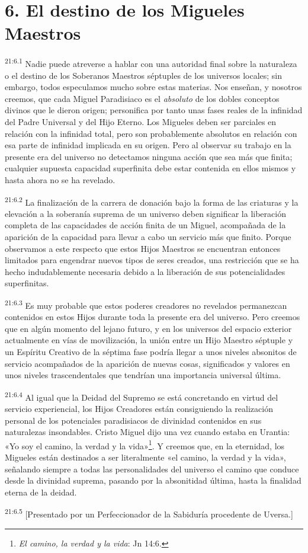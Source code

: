\section*{6. El destino de los Migueles Maestros}
\par
\textsuperscript{21:6.1} Nadie puede atreverse a hablar con una autoridad final sobre la naturaleza o el destino de los Soberanos Maestros séptuples de los universos locales; sin embargo, todos especulamos mucho sobre estas materias. Nos enseñan, y nosotros creemos, que cada Miguel Paradisiaco es el \textit{absoluto} de los dobles conceptos divinos que le dieron origen; personifica por tanto unas fases reales de la infinidad del Padre Universal y del Hijo Eterno. Los Migueles deben ser parciales en relación con la infinidad total, pero son probablemente absolutos en relación con esa parte de infinidad implicada en su origen. Pero al observar su trabajo en la presente era del universo no detectamos ninguna acción que sea más que finita; cualquier supuesta capacidad superfinita debe estar contenida en ellos mismos y hasta ahora no se ha revelado.

\par
\textsuperscript{21:6.2} La finalización de la carrera de donación bajo la forma de las criaturas y la elevación a la soberanía suprema de un universo deben significar la liberación completa de las capacidades de acción finita de un Miguel, acompañada de la aparición de la capacidad para llevar a cabo un servicio más que finito. Porque observamos a este respecto que estos Hijos Maestros se encuentran entonces limitados para engendrar nuevos tipos de seres creados, una restricción que se ha hecho indudablemente necesaria debido a la liberación de sus potencialidades superfinitas.

\par
\textsuperscript{21:6.3} Es muy probable que estos poderes creadores no revelados permanezcan contenidos en estos Hijos durante toda la presente era del universo. Pero creemos que en algún momento del lejano futuro, y en los universos del espacio exterior actualmente en vías de movilización, la unión entre un Hijo Maestro séptuple y un Espíritu Creativo de la séptima fase podría llegar a unos niveles absonitos de servicio acompañados de la aparición de nuevas cosas, significados y valores en unos niveles trascendentales que tendrían una importancia universal última.

\par
\textsuperscript{21:6.4} Al igual que la Deidad del Supremo se está concretando en virtud del servicio experiencial, los Hijos Creadores están consiguiendo la realización personal de los potenciales paradisiacos de divinidad contenidos en sus naturalezas insondables. Cristo Miguel dijo una vez cuando estaba en Urantia: «Yo soy el camino, la verdad y la vida»\footnote{\textit{El camino, la verdad y la vida}: Jn 14:6.}. Y creemos que, en la eternidad, los Migueles están destinados a ser literalmente «el camino, la verdad y la vida», señalando siempre a todas las personalidades del universo el camino que conduce desde la divinidad suprema, pasando por la absonitidad última, hasta la finalidad eterna de la deidad.

\par
\textsuperscript{21:6.5} [Presentado por un Perfeccionador de la Sabiduría procedente de Uversa.]